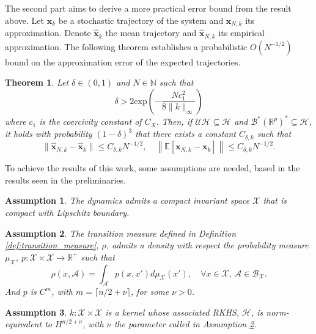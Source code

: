 \documentclass{article}
\newcommand{\R}{\mathbb{R}} %
\newcommand{\E}{\mathbb{E}} %
\newtheorem{theo}{Theorem}
\newtheorem{assu}{Assumption}
\renewcommand{\H}{\mathcal{H}}
\newcommand{\U}{\mathcal{U}}
\newcommand{\B}{\mathcal{B}}
\newcommand{\X}{\mathcal{X}}
\begin{document}
The second part aims to derive a more practical error bound from the result above. Let \( \mathbf{x}_k \) be a stochastic trajectory of the system and \( \mathbf{x}_{N,k} \) its approximation. Denote \( \hat{\mathbf{x}}_k \) the mean trajectory and \( \hat{\mathbf{x}}_{N,k} \) its empirical approximation. The following theorem establishes a probabilistic \( O(N^{-1/2}) \) bound on the approximation error of the expected trajectories.

\begin{theo} \label{theo:lifted_traj}
    Let $\delta \in (0, 1)$ and $N \in \mathbb{N}$ such that
\[
\delta > 2 \text{exp} \left ( -\frac{Nc_1^2}{8\|k\|_\infty}\right )
\]
where $c_1$ is the coercivity constant of $C_X$. Then, if $\U \H \subseteq \H$ and $\B^* (\R^p)^* \subseteq \H$, it holds with probability $(1-\delta)^3$ that there exists a constant $C_{\delta,k}$ such that
\[
\| \hat{\mathbf{x}}_{N,k} - \hat{\mathbf{x}}_k \| \leq C_{\delta,k} N^{-1/2}, \quad \left \| \E [\mathbf{x}_{N,k} - \mathbf{x}_k] \right \| \leq C_{\delta,k} N^{-1/2}.
\]
\end{theo}

To achieve the results of this work, some assumptions are needed, based in the  results seen in the preliminaries.

\begin{assu} \label{assu:assum1}
    The dynamics admits a compact invariant space $\X$ that is compact with Lipschitz boundary.
\end{assu}

\begin{assu} \label{assu:assum2}
    The transition measure defined in Definition \ref{def:transition_measure}, $\rho$, admits a density with respect the probability measure $\mu_\X$, $p:\X \times \X \to \R^+$ such that 
        \[
        \rho(x, \mathcal{A}) = \int_\mathcal{A} p(x,x') d\mu_\X(x'), \quad \forall x \in \X, \, \mathcal{A} \in \B_\X.
        \]
        And $p$ is $C^m$, with $m = \lceil n/2 + \nu \rceil$, for some $\nu > 0$. 
\end{assu}

\begin{assu} \label{assu:assum3}
    $k: \X \times \X$ is a kernel whose associated RKHS, $\H$, is norm-equivalent to $H^{n/2 + \nu}$, with $\nu$ the parameter called in Assumption \ref{assu:assum2}.
\end{assu}
\end{document}
